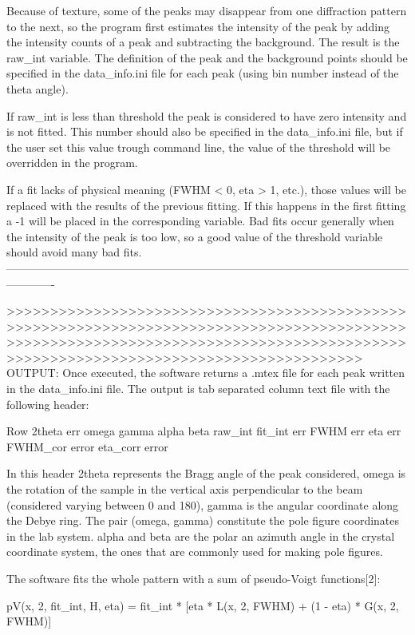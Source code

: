 Because of texture, some of the peaks may disappear from one diffraction pattern to the next, so the program first estimates the intensity of the peak by adding the intensity counts of a peak and subtracting the background. The result is the raw_int variable. The definition of the peak and the background points should be specified in the data_info.ini file for each peak (using bin number instead of the theta angle).

If raw_int is less than threshold the peak is considered to have zero intensity and is not fitted. This number should also be specified in the data_info.ini file, but if the user set this value trough command line, the value of the threshold will be overridden in the program.

If a fit lacks of physical meaning (FWHM < 0, eta > 1, etc.), those values will be replaced with the results of the previous fitting. If this happens in the first fitting a -1 will be placed in the corresponding variable. Bad fits occur generally when the intensity of the peak is too low, so a good value of the threshold variable should avoid many bad fits.
-------------------------------------------------------------------------------------------------------------------------

>>>>>>>>>>>>>>>>>>>>>>>>>>>>>>>>>>>>>>>>>>>>>>>>>>>>>>>>>>>>>>>>>>>>>>>>>>>>>>>>>>>>>>>>>>>>>>>>>>>>>>>>>>>>>>>>>>>>>>>>>>>>>>>>>>>>>>>>>>>>>>>>>>>>>>>>>>>>>>>>>>>>>>>>>>>>>>>>>>>
OUTPUT:
Once executed, the software returns a .mtex file for each peak written in the data_info.ini file. The output is tab separated column text file with the following
header:

Row 2theta err  omega gamma alpha  beta raw_int fit_int  err FWHM err eta err FWHM_cor error eta_corr error

In this header 2theta represents the Bragg angle of the peak considered, omega is the rotation of the sample in the vertical axis perpendicular to the beam (considered varying between 0 and 180), gamma is the angular coordinate along the Debye ring. The pair (omega, gamma) constitute the pole figure coordinates in the lab system. alpha and beta are the polar an azimuth angle in the crystal coordinate system, the ones that are commonly used for making pole figures.

The software fits the whole pattern with a sum of pseudo-Voigt functions[2]:

    pV(x, 2\theta, fit_int, H, eta) = fit_int * [eta * L(x, 2\theta, FWHM) + (1 - eta) * G(x, 2\theta, FWHM)]

